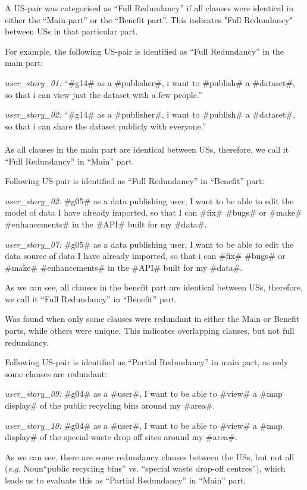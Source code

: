 \begin{definition}
	A US-pair was categorised as \enquote{Full Redundancy} if all clauses were identical in either the \enquote{Main part} or the \enquote{Benefit part}. This indicates "Full Redundancy" between USs in that particular part.
\end{definition}
\begin{example}
	For example, the following US-pair is identified as \enquote{Full Redundancy} in the main part:
	
	\textit{user\_story\_01:} \enquote{\#g14\# as a \#publisher\#, i want to \#publish\# a \#dataset\#, so that i can view just the dataset with a few people.}
	
	\textit{user\_story\_02:} \enquote{\#g14\# as a \#publisher\#, i want to \#publish\# a \#dataset\#, so that i can share the dataset publicly with everyone.}\\\\
	As all clauses in the main part are identical between USs, therefore, we call it \enquote{Full Redundancy} in \enquote{Main} part.
\end{example}
\begin{example}
	Following US-pair is identified as \enquote{Full Redundancy} in \enquote{Benefit} part:
	
	\textit{user\_story\_02:} \#g05\# as a data publishing user, I want to be able to edit the model of data I have already imported, so that I can \#fix\# \#bugs\# or \#make\# \#enhancements\# in the \#API\# built for my \#data\#.
	
	\textit{user\_story\_07:} \#g05\# as a data publishing user, I want to be able to edit the data source of data I have already imported, so that i can \#fix\# \#bugs\# or \#make\# \#enhancements\# in the \#API\# built for my \#data\#.
	
	As we can see, all clauses in the benefit part are identical between USs, therefore, we call it \enquote{Full Redundancy} in \enquote{Benefit} part.
\end{example}
\begin{definition}
	Was found when only some clauses were redundant in either the Main or Benefit parts, while others were unique. This indicates overlapping clauses, but not full redundancy.
\end{definition}
\begin{example}
	Following US-pair is identified as \enquote{Partial Redundancy} in main part, as only some clauses are redundant:
	
	\textit{user\_story\_09:} \#g04\# as a \#user\#, I want to be able to \#view\# a \#map display\# of the public recycling bins around my \#area\#.
	
	\textit{user\_story\_10:} \#g04\# as a \#user\#, I want to be able to \#view\# a \#map display\# of the special waste drop off sites around my \#area\#.
	
	As we can see, there are some redundancy clauses between the USs, but not all (\textit{e.g.} Noun\enquote{public recycling bins} vs. \enquote{special waste drop-off centres}), which leads us to evaluate this as \enquote{Partial Redundancy} in \enquote{Main} part.
\end{example}
